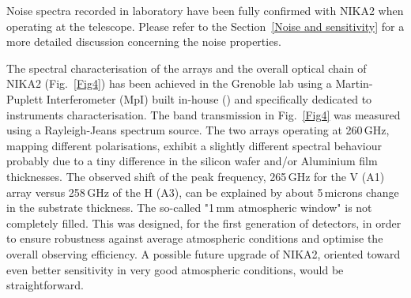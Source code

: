 \documentclass[]{aa} %
\begin{document}
Noise spectra recorded in laboratory have been fully confirmed with NIKA2 when operating at the telescope. Please refer to the Section~\ref{Noise and sensitivity} for a more detailed discussion concerning the noise properties. 

The spectral characterisation of the arrays and the overall optical chain of NIKA2 (Fig.~\ref{Fig4}) has been achieved in the Grenoble lab using a Martin-Puplett Interferometer (MpI) built in-house (\cite{Durand2008}) and specifically dedicated to instruments characterisation.
The band transmission in Fig.~\ref{Fig4} was measured using a Rayleigh-Jeans spectrum source.
The two arrays operating at 260\,GHz, mapping different polarisations, exhibit a slightly different spectral behaviour probably due to a tiny difference in the silicon wafer and/or Aluminium film thicknesses. The observed shift of the peak frequency, 265\,GHz for the V (A1) array versus 258\,GHz of the H (A3), can be explained by about 5\,microns change in the substrate thickness. The so-called "1\,mm atmospheric window" is not completely filled. This was designed, for the first generation of detectors, in order to ensure robustness against average atmospheric conditions and optimise the overall observing efficiency. A possible future upgrade of NIKA2, oriented toward even better sensitivity in very good atmospheric conditions, would be straightforward. 
\end{document}
